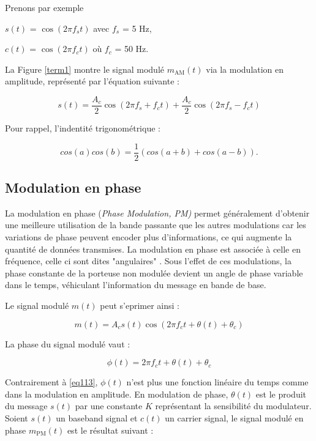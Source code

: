 Prenons par exemple 

$s(t)$ = $\cos(2\pi f_{s}t)$ avec $f_{s}$ = 5 Hz,

$c(t)$ = $\cos(2\pi f_{c}t)$ où $f_{c}$ = 50 Hz.

La Figure \ref{term1} montre le signal modulé $m_\mathrm{AM}(t)$ via la modulation en amplitude, représenté par l'équation suivante :

\begin{equation}\label{eq1140}
s(t) = \frac{A_c}{2} \cos(2\pi f_s + f_c t) + \frac{A_c}{2} \cos(2\pi f_s - f_c t)
\end{equation}

Pour rappel, l'indentité trigonométrique :

\begin{equation}\label{eq114}
cos(a)cos(b) = \frac{1}{2} (cos(a+b) + cos(a-b)).
\end{equation}



\subsection{Modulation en phase}

La modulation en phase (\textit{Phase Modulation, PM)} permet généralement d'obtenir une meilleure utilisation de la bande passante que les autres modulations car les variations de phase peuvent encoder plus d'informations, ce qui augmente la quantité de données transmises. La modulation en phase est associée à celle en fréquence, celle ci sont dites "angulaires" \cite{angle}. Sous l’effet de ces modulations, la phase constante de la porteuse non modulée devient un angle de phase variable dans le temps, véhiculant l’information du message en bande de base.

Le signal modulé $m(t)$ peut s'eprimer ainsi :

\begin{equation}\label{eq1200}
m(t) = A_c s(t) \cos(2 \pi f_c t + \theta(t) + \theta_c)
\end{equation}

La phase du signal modulé vaut :

\begin{equation}\label{eq1201}
\phi (t) = 2 \pi f_c t +\theta(t) + \theta_c 
\end{equation}

Contrairement à \ref{eq113}, $\phi(t)$ n'est plus une fonction linéaire du temps comme dans la modulation en amplitude. En modulation de phase, $\theta(t)$ est le produit du message $s(t)$ par une constante $K$ représentant la sensibilité du modulateur.
Soient $s(t)$ un baseband signal et $c(t)$ un carrier signal, le signal modulé en phase $m_\mathrm{PM}(t)$ est le résultat suivant :

